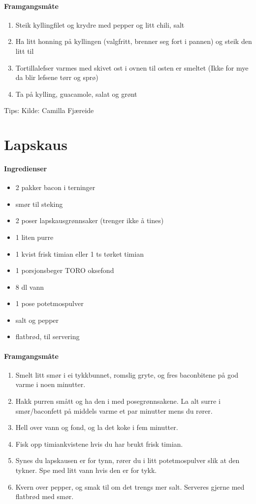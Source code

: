 \documentclass[12pt,a4paper]{book}
\begin{document}
{\paragraph{Framgangsmåte}
\begin{enumerate}[noitemsep]
	\item Steik kyllingfilet og krydre med pepper og litt chili, salt
	\item Ha litt honning på kyllingen (valgfritt, brenner seg fort i pannen) og steik den litt til
	\item Tortillalefser varmes med skivet ost i ovnen til osten er smeltet (Ikke for mye da blir lefsene tørr og sprø)
	\item Ta på kylling, guacamole, salat og grønt
\end{enumerate}

Tips:
Kilde: Camilla Fjæreide
\clearpage{}
\clearpage{}\section{﻿Lapskaus}

\paragraph{Ingredienser}
\begin{itemize}[noitemsep]
	\item 2 pakker bacon i terninger
	\item smør til steking
	\item 2 poser lapskausgrønnsaker (trenger ikke å tines)
	\item 1 liten purre
	\item 1 kvist frisk timian eller 1 ts tørket timian
	\item 1 porsjonsbeger TORO oksefond
	\item 8 dl vann
	\item 1 pose potetmospulver
	\item salt og pepper
	\item flatbrød, til servering
\end{itemize}

\paragraph{Framgangsmåte}
\begin{enumerate}[noitemsep]
	\item Smelt litt smør i ei tykkbunnet, romslig gryte, og fres baconbitene på god varme i noen minutter.
	\item Hakk purren smått og ha den i med posegrønnsakene. La alt surre i smør/baconfett på middels varme et par minutter mens du rører.
	\item Hell over vann og fond, og la det koke i fem minutter.
	\item Fisk opp timiankvistene hvis du har brukt frisk timian.
	\item Synes du lapskausen er for tynn, rører du i litt potetmospulver slik at den tykner. Spe med litt vann hvis den er for tykk.
	\item Kvern over pepper, og smak til om det trengs mer salt. Serveres gjerne med flatbrød med smør.
\end{enumerate}

}
\end{document}
